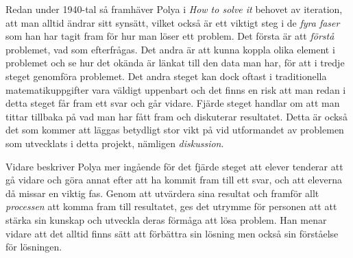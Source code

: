 \textcolor{Mahogany}{
    Redan under 1940-tal så framhäver Polya i \textsl{How to solve it} \cite{Polya} behovet av iteration, att man alltid ändrar sitt synsätt, vilket också är ett viktigt steg i de \textsl{fyra faser} som han har tagit fram för hur man löser ett problem.
    Det första är att \textsl{förstå} problemet, vad som efterfrågas. Det andra är att kunna koppla olika element i problemet och se hur det okända är länkat till den data man har, för att i tredje steget genomföra problemet. 
    Det andra steget kan dock oftast i traditionella matematikuppgifter vara väldigt uppenbart och det finns en risk att man redan i detta steget får fram ett svar och går vidare. 
    Fjärde steget handlar om att man tittar tillbaka på vad man har fått fram och diskuterar resultatet. Detta är också det som kommer att läggas betydligt stor vikt på vid utformandet av problemen som utvecklats i detta projekt, nämligen \textsl{diskussion}.
}

\textcolor{Mahogany}{
    Vidare beskriver Polya mer ingående för det fjärde steget att elever tenderar att gå vidare och göra annat efter att ha kommit fram till ett svar, och att eleverna då missar en viktig fas. Genom att utvärdera sina resultat och framför allt \textsl{processen} att komma fram till resultatet, ges det utrymme för personen att att stärka sin kunskap och utveckla deras förmåga att lösa problem. Han menar vidare att det alltid finns sätt att förbättra sin lösning men också sin förståelse för lösningen.
}